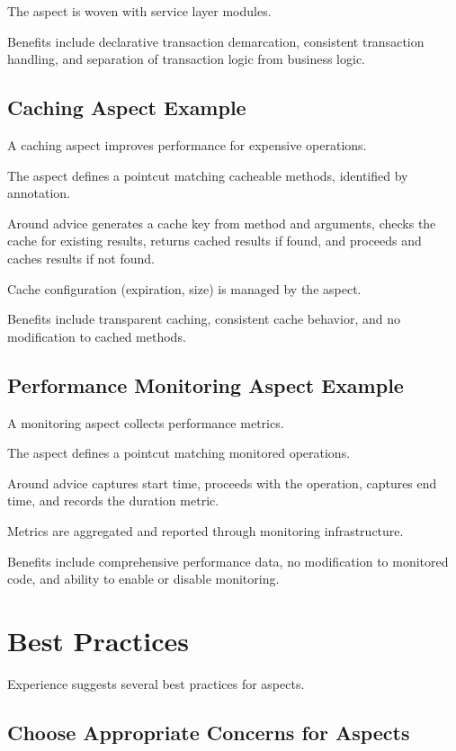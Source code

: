 \documentclass[11pt]{article}
\begin{document}
The aspect is woven with service layer modules.

Benefits include declarative transaction demarcation, consistent transaction handling, and separation of transaction logic from business logic.

\subsection{Caching Aspect Example}

A caching aspect improves performance for expensive operations.

The aspect defines a pointcut matching cacheable methods, identified by annotation.

Around advice generates a cache key from method and arguments, checks the cache for existing results, returns cached results if found, and proceeds and caches results if not found.

Cache configuration (expiration, size) is managed by the aspect.

Benefits include transparent caching, consistent cache behavior, and no modification to cached methods.

\subsection{Performance Monitoring Aspect Example}

A monitoring aspect collects performance metrics.

The aspect defines a pointcut matching monitored operations.

Around advice captures start time, proceeds with the operation, captures end time, and records the duration metric.

Metrics are aggregated and reported through monitoring infrastructure.

Benefits include comprehensive performance data, no modification to monitored code, and ability to enable or disable monitoring.

\section{Best Practices}

Experience suggests several best practices for aspects.

\subsection{Choose Appropriate Concerns for Aspects}
\end{document}
